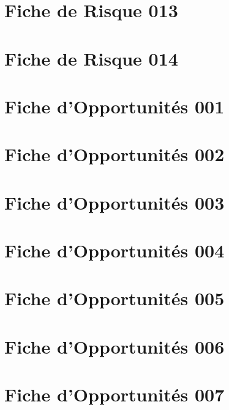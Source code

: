 \documentclass[asi]{picInsa}
\begin{document}
\chapter*{Fiche de Risque 013}

\chapter*{Fiche de Risque 014}



\chapter*{Fiche d'Opportunités 001}

\chapter*{Fiche d'Opportunités 002}

\chapter*{Fiche d'Opportunités 003}

\chapter*{Fiche d'Opportunités 004}

\chapter*{Fiche d'Opportunités 005}

\chapter*{Fiche d'Opportunités 006}

\chapter*{Fiche d'Opportunités 007}

\end{document}
